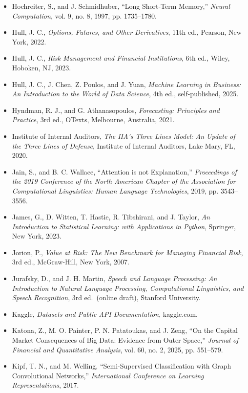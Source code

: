 \documentclass{book}
\begin{document}
\begin{itemize}
    \item Hochreiter, S., and J. Schmidhuber, ``Long Short-Term Memory,'' \emph{Neural Computation}, vol. 9, no. 8, 1997, pp. 1735--1780.
    \item Hull, J. C., \emph{Options, Futures, and Other Derivatives}, 11th ed., Pearson, New York, 2022.
    \item Hull, J. C., \emph{Risk Management and Financial Institutions}, 6th ed., Wiley, Hoboken, NJ, 2023.
    \item Hull, J. C., J. Chen, Z. Poulos, and J. Yuan, \emph{Machine Learning in Business: 
    An Introduction to the World of Data Science}, 4th ed., self-published, 2025.
    \item Hyndman, R. J., and G. Athanasopoulos, \emph{Forecasting: Principles and Practice}, 3rd ed., OTexts, Melbourne, Australia, 2021.
    \item Institute of Internal Auditors, \emph{The IIA's Three Lines Model: An Update of the Three Lines of Defense}, Institute of Internal Auditors, Lake Mary, FL, 2020.
    \item Jain, S., and B. C. Wallace, ``Attention is not Explanation,'' \emph{Proceedings of the 2019 Conference of the North American Chapter of the Association for Computational Linguistics: Human Language Technologies}, 2019, pp. 3543--3556.
    \item James, G., D. Witten, T. Hastie, R. Tibshirani, and J. Taylor, \emph{An Introduction to Statistical Learning: with Applications in Python}, Springer, New York, 2023.
    \item Jorion, P., \emph{Value at Risk: The New Benchmark for Managing Financial Risk}, 3rd ed., McGraw-Hill, New York, 2007.
    \item Jurafsky, D., and J. H. Martin, \emph{Speech and Language Processing: An Introduction to Natural Language Processing, Computational Linguistics, and Speech Recognition}, 3rd ed.\ (online draft), Stanford University.
    \item Kaggle, \emph{Datasets and Public API Documentation}, kaggle.com.
    \item Katona, Z., M. O. Painter, P. N. Patatoukas, and J. Zeng, ``On the Capital Market Consequences of Big Data: Evidence from Outer Space,'' \emph{Journal of Financial and Quantitative Analysis}, vol. 60, no. 2, 2025, pp. 551--579.
    \item Kipf, T. N., and M. Welling, ``Semi-Supervised Classification with Graph Convolutional Networks,'' \emph{International Conference on Learning Representations}, 2017.

\end{itemize}
\end{document}
